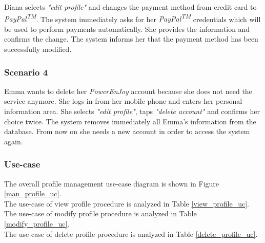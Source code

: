 Diana selects \emph{"edit profile"} and changes the payment method from credit card to \emph{PayPal\textsuperscript{TM}}. The system immediately asks for her \emph{PayPal\textsuperscript{TM}} credentials which will be used to perform payments automatically. She provides the information and confirms the change. The system informs her that the payment method has been successfully modified.

\subsubsection{Scenario 4}
Emma wants to delete her \emph{PowerEnJoy} account because she does not need the service anymore. She logs in from her mobile phone and enters her personal information area. She selects \emph{"edit profile"}, taps \emph{"delete account"} and confirms her choice twice. The system removes immediately all Emma's information from the database. From now on she needs a new account in order to access the system again.

\subsubsection{Use-case}
The overall profile management use-case diagram is shown in Figure \ref{man_profile_uc}. \\
The use-case of view profile procedure is analyzed in Table \ref{view_profile_uc}. \\
The use-case of modify profile procedure is analyzed in Table \ref{modify_profile_uc}. \\
The use-case of delete profile procedure is analyzed in Table \ref{delete_profile_uc}.

